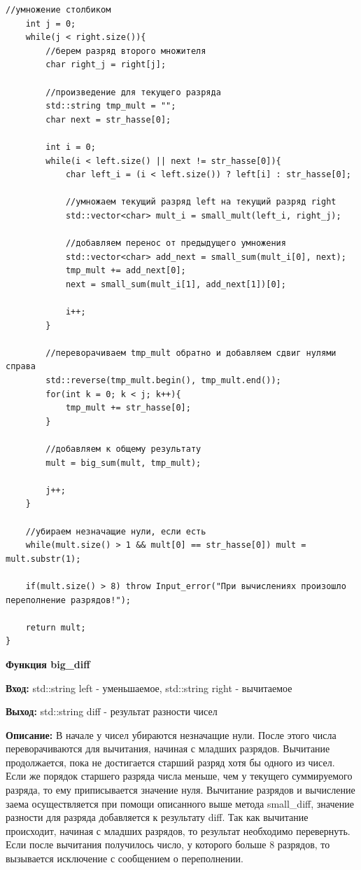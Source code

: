 \begin{lstlisting}[caption=big\_sum и big\_mult, label=lst:big-sum и big-mult]
    //умножение столбиком
    int j = 0;
    while(j < right.size()){
        //берем разряд второго множителя
        char right_j = right[j];
        
        //произведение для текущего разряда
        std::string tmp_mult = "";
        char next = str_hasse[0];
        
        int i = 0;
        while(i < left.size() || next != str_hasse[0]){
            char left_i = (i < left.size()) ? left[i] : str_hasse[0];

            //умножаем текущий разряд left на текущий разряд right
            std::vector<char> mult_i = small_mult(left_i, right_j);
            
            //добавляем перенос от предыдущего умножения
            std::vector<char> add_next = small_sum(mult_i[0], next);
            tmp_mult += add_next[0];
            next = small_sum(mult_i[1], add_next[1])[0];
            
            i++;
        }

        //переворачиваем tmp_mult обратно и добавляем сдвиг нулями справа
        std::reverse(tmp_mult.begin(), tmp_mult.end());
        for(int k = 0; k < j; k++){
            tmp_mult += str_hasse[0];
        }

        //добавляем к общему результату
        mult = big_sum(mult, tmp_mult);
        
        j++;
    }

    //убираем незначащие нули, если есть
    while(mult.size() > 1 && mult[0] == str_hasse[0]) mult = mult.substr(1);

    if(mult.size() > 8) throw Input_error("При вычислениях произошло переполнение разрядов!");

    return mult;
}
\end{lstlisting}

\textbf{Функция big\_diff } \par
\textbf{Вход:} std::string left - уменьшаемое, std::string right - вычитаемое\par
\textbf{Выход:} std::string diff - результат разности чисел\par
\textbf{Описание:} В начале у чисел убираются незначащие нули. После этого числа переворачиваются для вычитания, начиная с младших разрядов. Вычитание продолжается, пока не достигается старший разряд хотя бы одного из чисел. Если же порядок старшего разряда числа меньше, чем у текущего суммируемого разряда, то ему приписывается значение нуля. Вычитание разрядов и вычисление заема осуществляется при помощи описанного выше метода small\_diff, значение разности для разряда добавляется к результату diff. Так как вычитание происходит, начиная с младших разрядов, то результат необходимо перевернуть. Если после вычитания получилось число, у которого больше 8 разрядов, то вызывается исключение с сообщением о переполнении.\par
\vspace{10pt}

